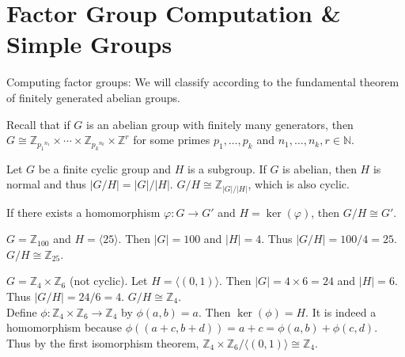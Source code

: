 
\section{Factor Group Computation \& Simple Groups}

\begin{note}
Computing factor groups: We will classify according to the fundamental theorem of finitely generated abelian groups.
\end{note}

\begin{prev}
    Recall that if $G$ is an abelian group with finitely many generators, then $G \cong \mathbb{Z}_{{p_1}^{n_1}} \times \cdots \times \mathbb{Z}_{{p_k}^{n_k}} \times \mathbb{Z}^r$ for some primes $p_1, \ldots, p_k$ and $n_1, \ldots, n_k, r \in \mathbb{N}$.
\end{prev}

\begin{theorem}
Let $G$ be a finite cyclic group and $H$ is a subgroup. If $G$ is abelian, then $H$ is normal and thus $|G/H| = |G|/|H|$. $G/H \cong \mathbb{Z}_{|G|/|H|}$, which is also cyclic.
\end{theorem}

\begin{theorem}
If there exists a homomorphism $\varphi: G \to G'$ and $H = \ker(\varphi)$, then $G/H \cong G'$.
\end{theorem}

\begin{eg}
    $G = \mathbb{Z}_{100}$ and $H = \langle 25 \rangle$. Then $|G| = 100$ and $|H| = 4$. Thus $|G/H| = 100/4 = 25$. $G/H \cong \mathbb{Z}_{25}$. 
\end{eg}

\begin{eg}
    $G = \mathbb{Z}_4 \times \mathbb{Z}_6$ (not cyclic). Let $H = \langle (0, 1) \rangle$. Then $|G| = 4 \times 6 = 24$ and $|H| = 6$. Thus $|G/H| = 24/6 = 4$. $G/H \cong \mathbb{Z}_4$.\\
    Define $\phi: \mathbb{Z}_4 \times \mathbb{Z}_6 \to \mathbb{Z}_4$ by $\phi(a, b) = a$. Then $\ker(\phi) = H$. It is indeed a homomorphism because $\phi((a+c, b+d)) = a+c = \phi(a, b) + \phi(c, d)$. Thus by the first isomorphism theorem, $\mathbb{Z}_4 \times \mathbb{Z}_6 / \langle (0, 1) \rangle \cong \mathbb{Z}_4$.
\end{eg}

